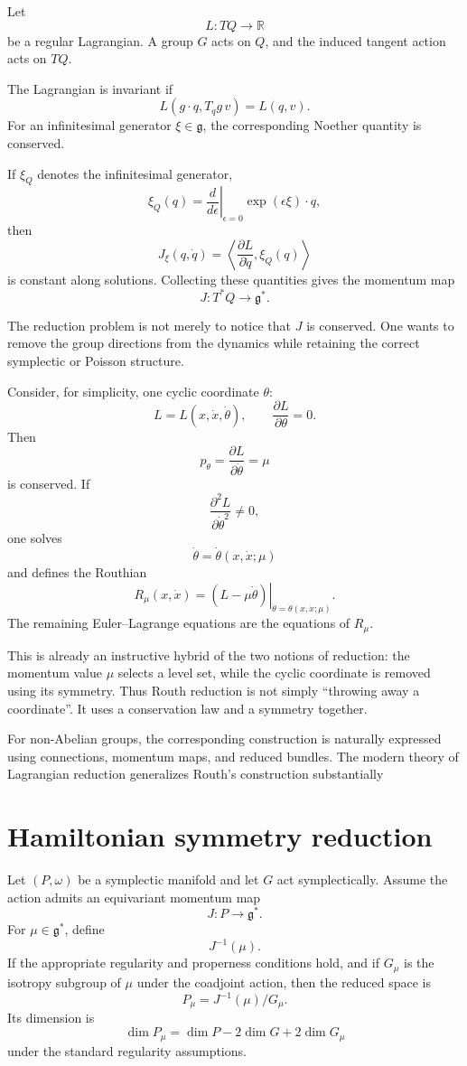 Let
\[
        L:TQ\to\mathbb{R}
\]
be a regular Lagrangian.  A group $G$ acts on $Q$, and the induced tangent
action acts on $TQ$.

The Lagrangian is invariant if
\[
        L(g\cdot q,T_qg\,v)=L(q,v).
\]
For an infinitesimal generator $\xi\in{\mathfrak g}$, the corresponding Noether quantity
is conserved.

If $\xi_Q$ denotes the infinitesimal generator,
\[
        \xi_Q(q)=
        \left.\frac{d}{d\epsilon}\right|_{\epsilon=0}
        \exp(\epsilon\xi)\cdot q,
\]
then
\[
        J_\xi(q,\dot q)
        =
        \left\langle
        \frac{\partial L}{\partial\dot q},
        \xi_Q(q)
        \right\rangle
\]
is constant along solutions.  Collecting these quantities gives the momentum
map
\[
        J:T^*Q\to{\mathfrak g}^*.
\]

The reduction problem is not merely to notice that $J$ is conserved.  One
wants to remove the group directions from the dynamics while retaining the
correct symplectic or Poisson structure.

Consider, for simplicity, one cyclic coordinate $\theta$:
\[
        L=L(x,\dot x,\dot\theta),
        \qquad
        \frac{\partial L}{\partial\theta}=0.
\]
Then
\[
        p_\theta=\frac{\partial L}{\partial\dot\theta}=\mu
\]
is conserved.  If
\[
        \frac{\partial^2L}{\partial\dot\theta^2}\neq0,
\]
one solves
\[
        \dot\theta=\dot\theta(x,\dot x;\mu)
\]
and defines the Routhian
\[
        R_\mu(x,\dot x)
        =
        \left.
        \left(L-\mu\dot\theta\right)
        \right|_{\dot\theta=\dot\theta(x,\dot x;\mu)}.
\]
The remaining Euler--Lagrange equations are the equations of $R_\mu$.

This is already an instructive hybrid of the two notions of reduction:
the momentum value $\mu$ selects a level set, while the cyclic coordinate is
removed using its symmetry.  Thus Routh reduction is not simply ``throwing
away a coordinate''.  It uses a conservation law and a symmetry together.

For non-Abelian groups, the corresponding construction is naturally expressed
using connections, momentum maps, and reduced bundles.  The modern theory of
Lagrangian reduction generalizes Routh's construction substantially

\section{Hamiltonian symmetry reduction}

Let $(P,\omega)$ be a symplectic manifold and let $G$ act symplectically.
Assume the action admits an equivariant momentum map
\[
        J:P\to{\mathfrak g}^*.
\]
For $\mu\in{\mathfrak g}^*$, define
\[
        J^{-1}(\mu).
\]
If the appropriate regularity and properness conditions hold, and if
$G_\mu$ is the isotropy subgroup of $\mu$ under the coadjoint action, then
the reduced space is
\[
        P_\mu
        =
        J^{-1}(\mu)/G_\mu.
\]
Its dimension is
\[
        \dim P_\mu
        =
        \dim P-2\dim G+2\dim G_\mu
\]
under the standard regularity assumptions.


